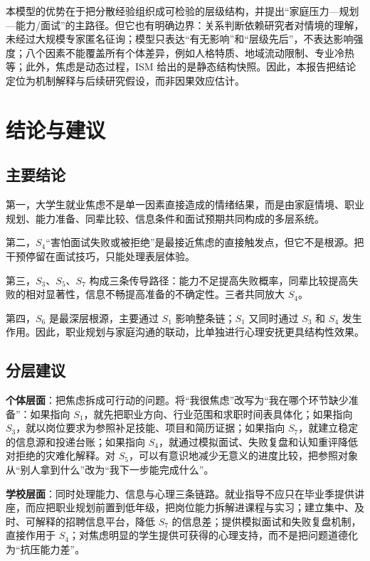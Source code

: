 \documentclass[UTF8,a4paper,zihao=-4]{ctexart}
\newcommand{\factor}[1]{\ensuremath{S_{#1}}}
\begin{document}
本模型的优势在于把分散经验组织成可检验的层级结构，并提出“家庭压力—规划—能力/面试”的主路径。但它也有明确边界：关系判断依赖研究者对情境的理解，未经过大规模专家匿名征询；模型只表达“有无影响”和“层级先后”，不表达影响强度；八个因素不能覆盖所有个体差异，例如人格特质、地域流动限制、专业冷热等；此外，焦虑是动态过程，ISM 给出的是静态结构快照。因此，本报告把结论定位为机制解释与后续研究假设，而非因果效应估计。

\section{结论与建议}

\subsection{主要结论}

第一，大学生就业焦虑不是单一因素直接造成的情绪结果，而是由家庭情境、职业规划、能力准备、同辈比较、信息条件和面试预期共同构成的多层系统。

第二，\factor{4}“害怕面试失败或被拒绝”是最接近焦虑的直接触发点，但它不是根源。把干预停留在面试技巧，只能处理表层体验。

第三，\factor{3}、\factor{5}、\factor{7} 构成三条传导路径：能力不足提高失败概率，同辈比较提高失败的相对显著性，信息不畅提高准备的不确定性。三者共同放大 \factor{4}。

第四，\factor{6} 是最深层根源，主要通过 \factor{1} 影响整条链；\factor{1} 又同时通过 \factor{3} 和 \factor{4} 发生作用。因此，职业规划与家庭沟通的联动，比单独进行心理安抚更具结构性效果。

\subsection{分层建议}

\textbf{个体层面}：把焦虑拆成可行动的问题。将“我很焦虑”改写为“我在哪个环节缺少准备”：如果指向 \factor{1}，就先把职业方向、行业范围和求职时间表具体化；如果指向 \factor{3}，就以岗位要求为参照补足技能、项目和简历证据；如果指向 \factor{7}，就建立稳定的信息源和投递台账；如果指向 \factor{4}，就通过模拟面试、失败复盘和认知重评降低对拒绝的灾难化解释。对 \factor{5}，可以有意识地减少无意义的进度比较，把参照对象从“别人拿到什么”改为“我下一步能完成什么”。

\textbf{学校层面}：同时处理能力、信息与心理三条链路。就业指导不应只在毕业季提供讲座，而应把职业规划前置到低年级，把岗位能力拆解进课程与实习；建立集中、及时、可解释的招聘信息平台，降低 \factor{7} 的信息差；提供模拟面试和失败复盘机制，直接作用于 \factor{4}；对焦虑明显的学生提供可获得的心理支持，而不是把问题道德化为“抗压能力差”。
\end{document}
